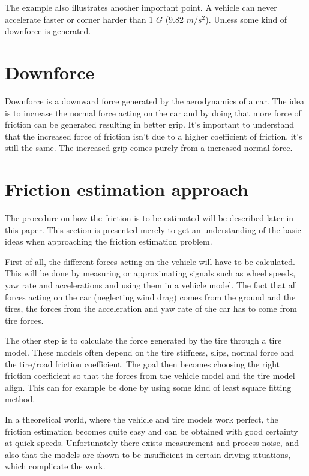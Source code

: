 The example also illustrates another important point. A vehicle can never accelerate faster or corner harder than 1 $ G $ (9.82 $ m/s^2 $). Unless some kind of downforce is generated. 

\section{Downforce}
Downforce is a downward force generated by the aerodynamics of a car. The idea is to increase the normal force acting on the car and by doing that more force of friction can be generated resulting in better grip. It's important to understand that the increased force of friction isn't due to a higher coefficient of friction, it's still the same. The increased grip comes purely from a increased normal force.

\section{Friction estimation approach}

The procedure on how the friction is to be estimated will be described later in this paper. This section is presented merely to get an understanding of the basic ideas when approaching the friction estimation problem.

First of all, the different forces acting on the vehicle will have to be calculated. This will be done by measuring or approximating signals such as wheel speeds, yaw rate and accelerations and using them in a vehicle model. The fact that all forces acting on the car (neglecting wind drag) comes from the ground and the tires, the forces from the acceleration and yaw rate of the car has to come from tire forces. 

The other step is to calculate the force generated by the tire through a tire model. These models often depend on the tire stiffness, slips, normal force and the tire/road friction coefficient. The goal then becomes choosing the right friction coefficient so that the forces from the vehicle model and the tire model align. This can for example be done by using some kind of least square fitting method. 

In a theoretical world, where the vehicle and tire models work perfect, the friction estimation becomes quite easy and can be obtained with good certainty at quick speeds. Unfortunately there exists measurement and process noise, and also that the models are shown to be insufficient in certain driving situations, which complicate the work.

